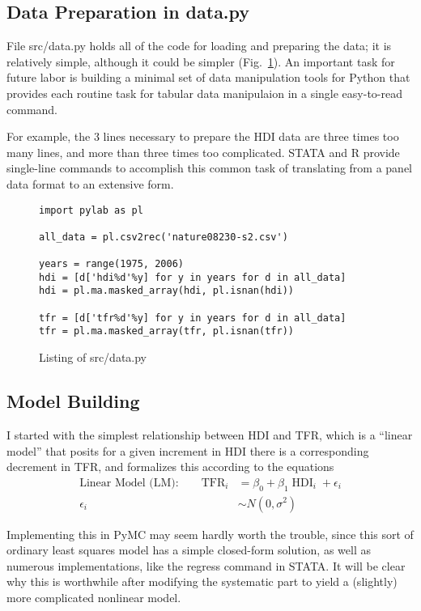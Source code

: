 \documentclass[10pt]{bmc_article}
\def\TFR{\operatorname{TFR}}
\def\HDI{\operatorname{HDI}}
\newenvironment{bmcformat}{\begin{raggedright}\baselineskip20pt\sloppy\setboolean{publ}{false}}{\end{raggedright}\baselineskip20pt\sloppy}
\begin{document}
\begin{bmcformat}
  \subsection*{Data Preparation in data.py}
  File src/data.py holds all of the code for loading and preparing the
  data; it is relatively simple, although it could be simpler
  (Fig.~\ref{src/data.py}).  An important task for future labor is
  building a minimal set of data manipulation tools for Python that
  provides each routine task for tabular data manipulaion in a single
  easy-to-read command.

  For example, the 3 lines necessary to prepare the HDI data are three
  times too many lines, and more than three times too complicated.
  STATA and R provide single-line commands to accomplish this common
  task of translating from a panel data format to an extensive form.
\begin{figure}
\begin{verbatim}
import pylab as pl

all_data = pl.csv2rec('nature08230-s2.csv')

years = range(1975, 2006)
hdi = [d['hdi%d'%y] for y in years for d in all_data]
hdi = pl.ma.masked_array(hdi, pl.isnan(hdi))

tfr = [d['tfr%d'%y] for y in years for d in all_data]
tfr = pl.ma.masked_array(tfr, pl.isnan(tfr))
\end{verbatim}
\caption{Listing of src/data.py}
\label{src/data.py}
\end{figure}

  \subsection*{Model Building}
I started with the simplest relationship between HDI and TFR, which is
a ``linear model'' that posits for a given increment in HDI there is a
corresponding decrement in TFR, and formalizes this according to the
equations
\begin{align*}
\text{Linear Model (LM):}\qquad
\TFR_i &= \beta_0 + \beta_1 \HDI_i + \epsilon_i\\
\epsilon_i &\sim N(0, \sigma^2)
\end{align*}

Implementing this in PyMC may seem hardly worth the trouble, since
this sort of ordinary least squares model has a simple closed-form
solution, as well as numerous implementations, like the regress
command in STATA.  It will be clear why this is worthwhile after
modifying the systematic part to yield a (slightly) more complicated
nonlinear model.


\end{bmcformat}
\end{document}
